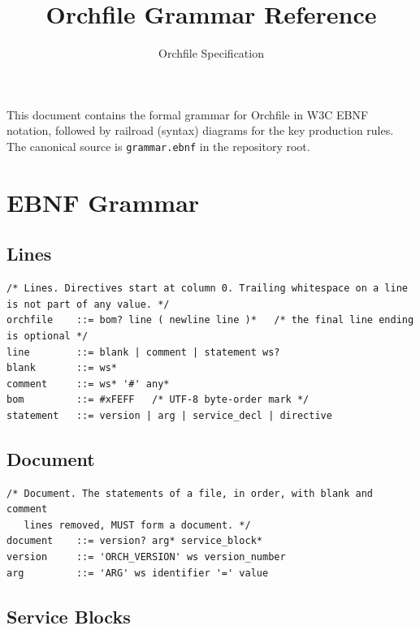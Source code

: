 \documentclass[a4paper,11pt]{article}
\title{\textbf{Orchfile Grammar Reference}}
\author{Orchfile Specification}
\date{}
\begin{document}
\maketitle
\thispagestyle{empty}

\noindent
This document contains the formal grammar for Orchfile in W3C EBNF notation,
followed by railroad (syntax) diagrams for the key production rules.
The canonical source is \texttt{grammar.ebnf} in the repository root.

\tableofcontents
\newpage

\section{EBNF Grammar}

\subsection{Lines}

\begin{lstlisting}
/* Lines. Directives start at column 0. Trailing whitespace on a line is not part of any value. */
orchfile    ::= bom? line ( newline line )*   /* the final line ending is optional */
line        ::= blank | comment | statement ws?
blank       ::= ws*
comment     ::= ws* '#' any*
bom         ::= #xFEFF   /* UTF-8 byte-order mark */
statement   ::= version | arg | service_decl | directive
\end{lstlisting}

\subsection{Document}

\begin{lstlisting}
/* Document. The statements of a file, in order, with blank and comment
   lines removed, MUST form a document. */
document    ::= version? arg* service_block*
version     ::= 'ORCH_VERSION' ws version_number
arg         ::= 'ARG' ws identifier '=' value
\end{lstlisting}

\subsection{Service Blocks}
\end{document}

